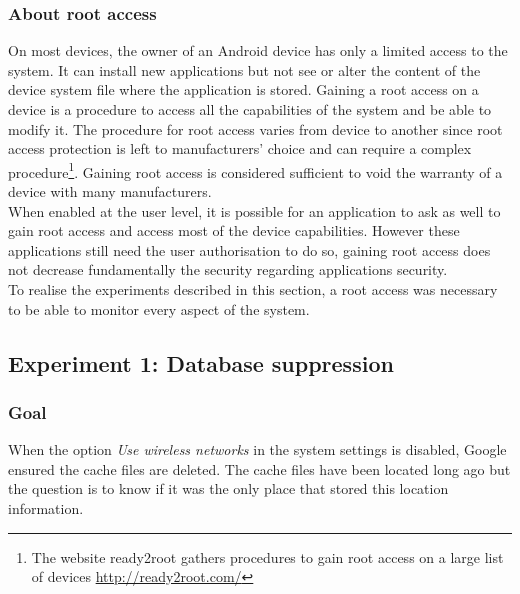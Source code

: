 \subsubsection*{About root access}

On most devices, the owner of an Android device has only a limited access to the system.
It can install new applications but not see or alter the content of the device system file where the application is stored.
Gaining a root access on a device is a procedure to access all the capabilities of the system and be able to modify it.
The procedure for root access varies from device to another since root access protection is left to manufacturers' choice and can require a complex procedure\footnote{The website ready2root gathers procedures to gain root access on a large list of devices \url{http://ready2root.com/}}.
Gaining root access is considered sufficient to void the warranty of a device with many manufacturers.\\

When enabled at the user level, it is possible for an application to ask as well to gain root access and access most of the device capabilities.
However these applications still need the user authorisation to do so, gaining root access does not decrease fundamentally the security regarding applications security.\\

To realise the experiments described in this section, a root access was necessary to be able to monitor every aspect of the system.

\subsection{Experiment 1: Database suppression}

\subsubsection{Goal}

When the option \emph{Use wireless networks} in the system settings is disabled, Google ensured the cache files are deleted.
The cache files have been located long ago but the question is to know if it was the only place that stored this location information.\\

